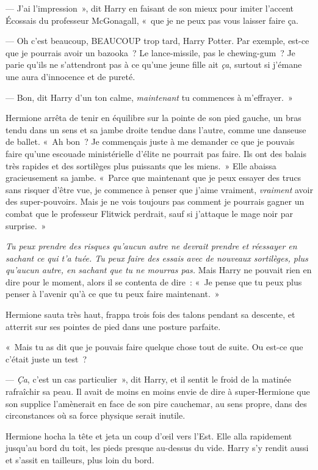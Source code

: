--- J'ai l'impression~», dit Harry en faisant de son mieux pour imiter l'accent Écossais du professeur McGonagall, «~que je ne peux pas vous laisser faire ça.

--- Oh c'est beaucoup, BEAUCOUP trop tard, Harry Potter.
Par exemple, est-ce que je pourrais avoir un bazooka~?
Le lance-missile, pas le chewing-gum~?
Je parie qu'ils ne s'attendront pas à ce qu'une jeune fille ait \emph{ça}, surtout si j'émane une aura d'innocence et de pureté.

--- Bon, dit Harry d'un ton calme, \emph{maintenant} tu commences à m'effrayer.~»

Hermione arrêta de tenir en équilibre sur la pointe de son pied gauche, un bras tendu dans un sens et sa jambe droite tendue dans l'autre, comme une danseuse de ballet.
«~Ah bon~?
Je commençais juste à me demander ce que je pouvais faire qu'une escouade ministérielle d'élite ne pourrait pas faire.
Ils ont des balais très rapides et des sortilèges plus puissants que les miens.~»
Elle abaissa gracieusement sa jambe.
«~Parce que maintenant que je peux essayer des trucs sans risquer d'être vue, je commence à penser que j'aime vraiment, \emph{vraiment} avoir des super-pouvoirs.
Mais je ne vois toujours pas comment je pourrais gagner un combat que le professeur Flitwick perdrait, sauf si j'attaque le mage noir par surprise.~»

\emph{Tu peux prendre des risques qu'aucun autre ne devrait prendre et réessayer en sachant ce qui t'a tuée.
Tu peux faire des essais avec de nouveaux sortilèges, plus qu'aucun autre, en sachant que tu ne mourras pas.} Mais Harry ne pouvait rien en dire pour le moment, alors il se contenta de dire~: «~Je pense que tu peux plus penser à l'avenir qu'à ce que tu peux faire maintenant.~»

Hermione sauta très haut, frappa trois fois des talons pendant sa descente, et atterrit sur ses pointes de pied dans une posture parfaite.

«~Mais tu as dit que je pouvais faire quelque chose tout de suite.
Ou est-ce que c'était juste un test~?

--- \emph{Ça}, c'est un cas particulier~», dit Harry, et il sentit le froid de la matinée rafraîchir sa peau.
Il avait de moins en moins envie de dire à super-Hermione que son supplice l'amènerait en face de son pire cauchemar, au sens propre, dans des circonstances où sa force physique serait inutile.

Hermione hocha la tête et jeta un coup d'œil vers l'Est.
Elle alla rapidement jusqu'au bord du toit, les pieds presque au-dessus du vide.
Harry s'y rendit aussi et s'assit en tailleurs, plus loin du bord.

